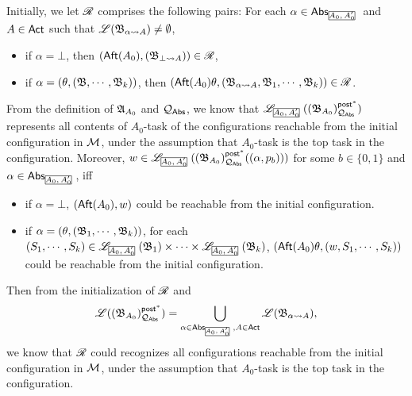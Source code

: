 Initially, we let $\mathscr{R}$ comprises the following pairs:
For each $\alpha\in\abs_{\mhcancel{A_0,A_0'}}$ and $A\in{\sf Act}$ such that ${\mathscr{L} }({\mathfrak{B} }_{\alpha\rightsquigarrow A})\neq \emptyset$,
\begin{itemize}
    \item if $\alpha = \bot$, then $({\sf Aft}(A_0), ({\mathfrak{B} }_{\bot\rightsquigarrow A}))\in\mathscr{R}$,
    \item if $\alpha = (\theta,({\mathfrak{B} },\cdots,{\mathfrak{B} }_k))$, then $({\sf Aft}(A_0)\theta, ({\mathfrak{B} }_{\alpha\rightsquigarrow A}, {\mathfrak{B} }_1, \cdots, {\mathfrak{B} }_k))\in\mathscr{R}$.
\end{itemize}
From the definition of ${\mathfrak{A} }_{A_0}$ and ${\mathcal{Q} }_{{\mathsf{Abs} }}$, we know that $\Lang_{\mhcancel{A_0,A_0'}}((\AutB_{A_0})^{\post^*}_{\Qq_{\abs}})$ represents all contents of $A_0$-task of the configurations reachable from the initial configuration in ${\mathcal{M} }$, under the assumption that $A_0$-task is the top task in the configuration. Moreover, $w\in\Lang_{\mhcancel{A_0,A_0'}}((\AutB_{A_0})^{\post^*}_{\Qq_{\abs}}((\alpha,p_b)))$ for some $b\in\{0,1\}$ and $\alpha \in \abs_{\mhcancel{A_0,A_0'}}$, iff
\begin{itemize}
    \item if $\alpha = \bot$, $({\sf Aft}(A_0), w)$ could be reachable from the initial configuration.
    \item if $\alpha = (\theta, ({\mathfrak{B} }_1, \cdots, {\mathfrak{B} }_k))$, for each $(S_1, \cdots, S_k) \in \Lang_{\mhcancel{A_0,A_0'}}(\AutB_1) \times \cdots \times \Lang_{\mhcancel{A_0,A_0'}}(\AutB_k)$, $({\sf Aft}(A_0)\theta, (w, S_1, \cdots, S_k))$ could be reachable from the initial configuration.
\end{itemize}
Then from the initialization of $\mathscr{R}$ and
$$\Lang((\AutB_{A_0})^{\post^*}_{\Qq_{\abs}}) = \bigcup\limits_{\alpha\in\abs_{\mhcancel{A_0,A_0'}}, A\in\act}\Lang(\AutB_{\alpha\rightsquigarrow A}),$$
we know that $\mathscr{R}$ could recognizes all configurations reachable from the initial configuration in ${\mathcal{M} }$, under the assumption that $A_0$-task is the top task in the configuration.

